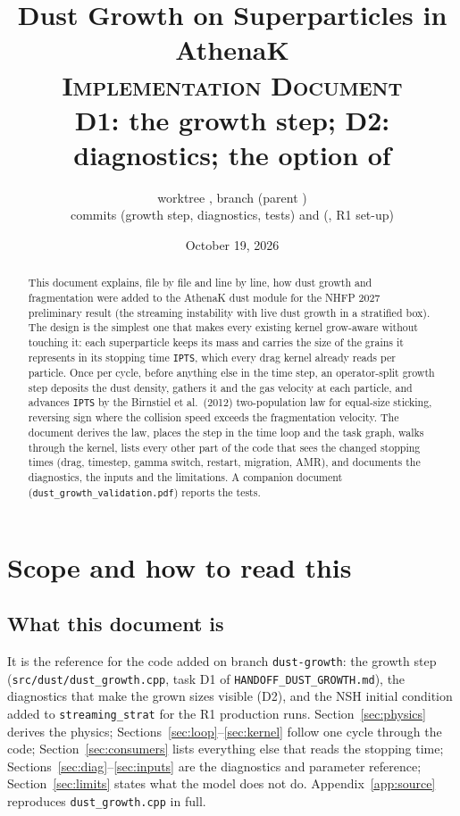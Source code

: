 \documentclass[11pt]{article}
\title{Dust Growth on Superparticles in AthenaK\\[0.4em]
       \large \textsc{Implementation Document}\\
       \large D1: the growth step; D2: diagnostics; the \code{nsh\_init} option of
       \code{streaming\_strat}}
\author{worktree \code{athenak-worktrees/dust-growth}, branch \code{dust-growth}
        (parent \code{9aaa5639})\\
        \small commits \code{a821cb4d} (growth step, diagnostics, tests) and
        \code{e231fc7f} (\code{nsh\_init}, R1 set-up)}
\date{October 19, 2026}
\newcommand{\code}[1]{\texttt{#1}}
\newcommand{\file}[1]{\texttt{\small #1}}
\begin{document}
\maketitle

\begin{abstract}
\noindent
This document explains, file by file and line by line, how dust growth and
fragmentation were added to the AthenaK dust module for the NHFP 2027 preliminary
result (the streaming instability with live dust growth in a stratified box). The design
is the simplest one that makes every existing kernel grow-aware without touching it:
each superparticle keeps its mass and carries the size of the grains it represents in
its stopping time \code{IPTS}, which every drag kernel already reads per particle. Once
per cycle, before anything else in the time step, an operator-split growth step
deposits the dust density, gathers it and the gas velocity at each particle, and
advances \code{IPTS} by the Birnstiel et al.\ (2012) two-population law for equal-size
sticking, reversing sign where the collision speed exceeds the fragmentation velocity.
The document derives the law, places the step in the time loop and the task graph,
walks through the kernel, lists every other part of the code that sees the changed
stopping times (drag, timestep, gamma switch, restart, migration, AMR), and documents
the diagnostics, the inputs and the limitations. A companion document
(\file{dust\_growth\_validation.pdf}) reports the tests.
\end{abstract}

\tableofcontents
\newpage

\section{Scope and how to read this}

\subsection{What this document is}
It is the reference for the code added on branch \code{dust-growth}: the growth step
(\file{src/dust/dust\_growth.cpp}, task D1 of \file{HANDOFF\_DUST\_GROWTH.md}), the
diagnostics that make the grown sizes visible (D2), and the NSH initial condition added
to \code{streaming\_strat} for the R1 production runs. Section~\ref{sec:physics}
derives the physics; Sections~\ref{sec:loop}--\ref{sec:kernel} follow one cycle through
the code; Section~\ref{sec:consumers} lists everything else that reads the stopping
time; Sections~\ref{sec:diag}--\ref{sec:inputs} are the diagnostics and parameter
reference; Section~\ref{sec:limits} states what the model does not do.
Appendix~\ref{app:source} reproduces \file{dust\_growth.cpp} in full.
\end{document}
